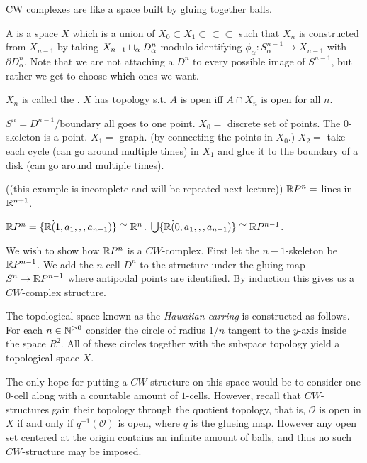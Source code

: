 \documentclass[11pt,leqno,oneside]{amsart}
\newenvironment{dateenv}{
  \vspace{1em}
}{
  \vspace{1em}
}
\newcommand{\mydate}[4]{
  \newdate{#1}{#2}{#3}{#4}
  \begin{dateenv}
    \hfill\displaydate{#1}
  \end{dateenv}
}
\numberwithin{thm}{section}
\renewcommand{\d}{\partial}
\begin{document}
CW complexes are like a space built by gluing together balls.
\begin{defn}
  A  is a space $X$ which is a union of
  $X_0 \subset X_1 \subset \subset \subset$ such that $X_n$ is
  constructed from $X_{n-1}$ by taking
  $X_{n-1} \sqcup_{\alpha} D_{\alpha}^n$ modulo identifying $\phi_\alpha \colon S_\alpha^{n-1} \to X_{n-1}$ with $\d D_\alpha^n$.  Note that we are not attaching a $D^n$ to every possible image of $S^{n-1}$, but rather we get to choose which ones we want.

  $X_n$ is called the .  $X$ has topology s.t. $A$ is open iff $A \cap X_n$ is open for all $n$.
\end{defn}
\begin{example}
  $S^n = D^{n-1}/\text{boundary}$ all goes to one point.  $X_0 =$
  discrete set of points.  The $0$-skeleton is a point.  $X_1 =$
  graph. (by connecting the points in $X_0$.)  $X_2 =$ take each cycle
  (can go around multiple times) in $X_1$ and glue it to the boundary
  of a disk (can go around multiple times).
\end{example}
\begin{example}
  ((this example is incomplete and will be repeated next lecture))
  ${\mathbb R} P^n =$ lines in ${\mathbb R}^{n+1}$.

  ${\mathbb R} P^n = \{ {\mathbb R} \dot (1, a_1,,, a_{n-1})\} \mathrel{\cong} {\mathbb R}^{n}$.
  $\bigcup \{ {\mathbb R} \dot (0, a_1,,, a_{n-1})\} \mathrel{\cong} {\mathbb R} P^{n-1}$.
\end{example}

\mydate{d7}{6}{2}{2017}

We wish to show how \({\mathbb R} P^n\) is a \(CW\)-complex. First let the
\(n-1\)-skeleton be \({\mathbb R} P^{n-1}\). We add the \(n\)-cell \(D^n\) to the
structure under the gluing map \(S^{n} \to {\mathbb R} P^{n-1}\) where
antipodal points are identified. By induction this gives us a
\(CW\)-complex structure.

\begin{example}
  The topological space known as the \emph{Hawaiian earring} is
  constructed as follows.  For each \(n \in {\mathbb N}^{> 0}\) consider the circle of
  radius \(1/n\) tangent to the \(y\)-axis inside the space \(R^2\). All of these circles
  together with the subspace topology yield a topological space \(X\).

  The only hope for putting a \(CW\)-structure on this space would be
  to consider one \(0\)-cell along with a countable amount of
  \(1\)-cells. However, recall that \(CW\)-structures gain their
  topology through the quotient topology, that is, \(\mathcal{O}\) is
  open in \(X\) if and only if \(q^{-1}(\mathcal{O})\) is open, where \(q\) is
  the glueing map. However any open set centered at the origin
  contains an infinite amount of balls, and thus no such
  \(CW\)-structure may be imposed.
\end{example}
\end{document}
